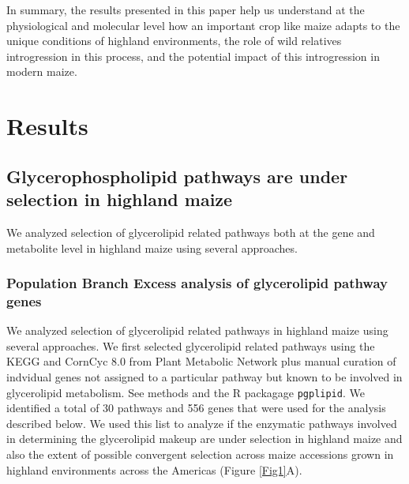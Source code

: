 \documentclass[9pt,twocolumn,twoside]{BioRxiv}
\begin{document}
In summary, the results presented in this paper help us understand at the physiological and molecular level how an important crop like maize adapts to the unique conditions of highland environments, the role of wild relatives introgression in this process, and the potential impact of this introgression in modern maize.

\section{Results}
\label{sec:results}

\subsection{Glycerophospholipid pathways are under selection in  highland maize} 
We analyzed selection of glycerolipid related pathways both at the gene and metabolite level in highland maize using several approaches. 

\subsubsection{Population Branch Excess analysis of glycerolipid pathway genes} 
We analyzed selection of glycerolipid related pathways in highland maize using several approaches.
We first selected glycerolipid related pathways using the KEGG \citep{kanehisa2019} and CornCyc 8.0 from  Plant Metabolic Network \citep{Schlapfer2017-yl} plus manual curation of indvidual genes not assigned to a particular pathway but known to be involved in glycerolipid metabolism. See methods and the R packagage \verb|pgplipid|. 
We identified a total of 30 pathways and 556 genes that were used for the analysis described below. 
We used this list to analyze if the enzymatic pathways involved in determining the glycerolipid makeup are under selection in highland maize and also the extent of possible convergent selection across maize accessions grown in highland environments across the Americas (Figure \ref{Fig1}A).  
\end{document}
